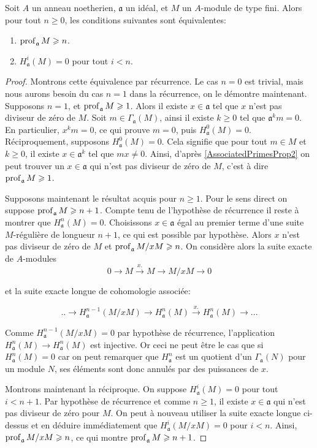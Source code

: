 \begin{prop}
Soit $A$ un anneau noetherien, $\mathfrak{a}$ un idéal, et $M$ un $A$-module de type fini. Alors pour tout $n\geq 0$, les conditions suivantes sont équivalentes:
\begin{enumerate}
\item $\operatorname{prof}_\mathfrak{a} M\geqslant n$.
\item $H_\mathfrak{a}^i(M)=0$ pour tout $i<n$.
\end{enumerate}
\end{prop}
\begin{proof}
Montrons cette équivalence par récurrence. Le cas $n=0$ est trivial, mais nous aurons besoin du cas $n=1$ dans la récurrence, on le démontre maintenant. Supposons $n=1$, et $\operatorname{prof}_\mathfrak{a} M\geqslant 1$. Alors il existe $x\in\mathfrak{a}$ tel que $x$ n'est pas diviseur de zéro de $M$. Soit $m\in \Gamma_ \mathfrak{a}(M)$, ainsi il existe $k\geq 0$ tel que $\mathfrak{a}^k m=0$. En particulier, $x^km=0$, ce qui prouve $m=0$, puis $H^0_\mathfrak{a}(M)=0$. Réciproquement, supposons $H^0_\mathfrak{a}(M)=0$. Cela signifie que pour tout $m\in M$ et $k\geq 0$, il existe $x\in \mathfrak{a}^k$ tel que $mx\neq 0$. Ainsi, d'après \ref{AssociatedPrimesProp2} on peut trouver un $x\in \mathfrak{a}$ qui n'est pas diviseur de zéro de $M$, c'est à dire $\operatorname{prof}_\mathfrak{a}M\geqslant 1$.

Supposons maintenant le résultat acquis pour $n\geq 1$. Pour le sens direct on suppose $\operatorname{prof}_\mathfrak{a} M\geqslant n+1$. Compte tenu de l'hypothèse de récurrence il reste à montrer que $H^n_\mathfrak{a}(M)=0$. Choisissons $x\in \mathfrak{a}$ égal au premier terme d'une suite $M$-régulière de longueur $n+1$, ce qui est possible par hypothèse. Alors $x$ n'est pas diviseur de zéro de $M$ et $\operatorname{prof}_\mathfrak{a} M/xM \geqslant n$. On considère alors la suite exacte de $A$-modules
$$0\rightarrow M \xrightarrow{x.} M\rightarrow M/xM\rightarrow 0$$

\noindent et la suite exacte longue de cohomologie associée:

$$..\rightarrow H^{n-1}_\mathfrak{a}(M/xM) \rightarrow H^n_\mathfrak{a}(M) \xrightarrow{x.}  H^n_\mathfrak{a}(M) \rightarrow ...$$

\noindent Comme $H^{n-1}_\mathfrak{a}(M/xM)=0$ par hypothèse de récurrence, l'application $H^n_\mathfrak{a}(M) \rightarrow  H^n_\mathfrak{a}(M)$ est injective. Or ceci ne peut être le cas que si $H^n_\mathfrak{a}(M)=0$ car on peut remarquer que $H^n_\mathfrak{a}$ est un quotient d'un $\Gamma_\mathfrak{a}(N)$ pour un module $N$, ses éléments sont donc annulés par des puissances de $x$. 

Montrons maintenant la réciproque. On suppose $H^i_\mathfrak{a}(M)=0$ pour tout $i<n+1$. Par hypothèse de récurrence et comme $n\geq 1$, il existe $x\in \mathfrak{a}$ qui n'est pas diviseur de zéro pour $M$. On peut à nouveau utiliser la suite exacte longue ci-dessus et en déduire immédiatement que $H^{i}_\mathfrak{a}(M/xM)=0$ pour $i<n$. Ainsi, $\operatorname{prof}_\mathfrak{a} M/xM\geqslant n$, ce qui montre $\operatorname{prof}_\mathfrak{a} M \geqslant n+1$.
\end{proof}


